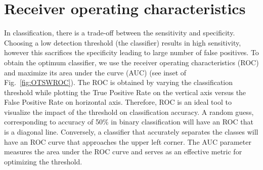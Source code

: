 \documentclass[aps,pra,reprint,superscriptaddress]{revtex4-1}
\begin{document}
\section{Receiver operating characteristics}

In classification, there is a trade-off between the sensitivity and specificity. Choosing a low detection threshold (the classifier) results in high sensitivity, however this sacrifices the specificity leading to large number of false positives. To obtain the optimum classifier, we use the receiver operating characteristics (ROC) and maximize its area under the curve (AUC) (see inset of Fig.~\ref{fig:OTSWROC}). The ROC is obtained by varying the classification threshold while plotting the True Positive Rate on the vertical axis versus the False Positive Rate on horizontal axis. Therefore, ROC is an ideal tool to visualize the impact of the threshold on classification accuracy. A random guess, corresponding to accuracy of 50\% in binary classification will have an ROC that is a diagonal line. Conversely, a classifier that accurately separates the classes will have an ROC curve that approaches the upper left corner. The AUC parameter measures the area under the ROC curve and serves as an effective metric for optimizing the threshold.
\end{document}

